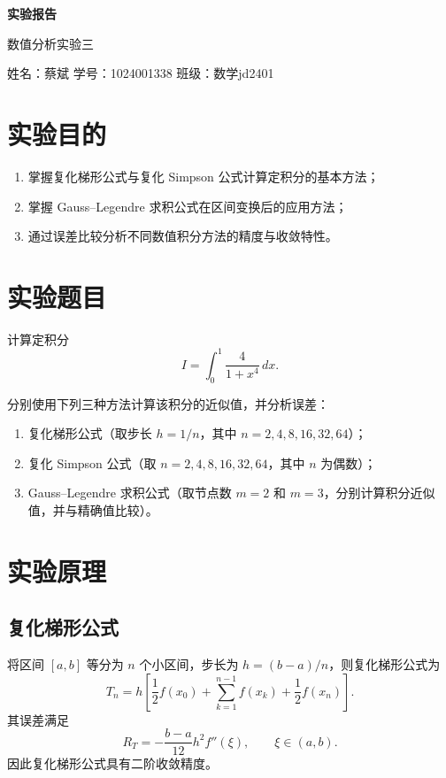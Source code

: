 \documentclass[12pt,a4paper]{ctexart}
\begin{document}
\thispagestyle{empty}

\begin{center}
    {\bfseries 实验报告}

    \vspace{0.7em}
    {数值分析实验三}

    \vspace{1em}
    姓名：蔡斌 \qquad 学号：1024001338 \qquad 班级：\mbox{数学jd2401}
\end{center}

\section{实验目的}

\begin{enumerate}
    \item 掌握复化梯形公式与复化 Simpson 公式计算定积分的基本方法；
    \item 掌握 Gauss--Legendre 求积公式在区间变换后的应用方法；
    \item 通过误差比较分析不同数值积分方法的精度与收敛特性。
\end{enumerate}

\section{实验题目}

计算定积分
\[
I=\int_0^1 \frac{4}{1+x^4}\,dx.
\]

分别使用下列三种方法计算该积分的近似值，并分析误差：
\begin{enumerate}
    \item 复化梯形公式（取步长 $h=1/n$，其中 $n=2,4,8,16,32,64$）；
    \item 复化 Simpson 公式（取 $n=2,4,8,16,32,64$，其中 $n$ 为偶数）；
    \item Gauss--Legendre 求积公式（取节点数 $m=2$ 和 $m=3$，分别计算积分近似值，并与精确值比较）。
\end{enumerate}

\section{实验原理}

\subsection{复化梯形公式}

将区间 $[a,b]$ 等分为 $n$ 个小区间，步长为 $h=(b-a)/n$，则复化梯形公式为
\[
T_n=h\left[\frac{1}{2}f(x_0)+\sum_{k=1}^{n-1}f(x_k)+\frac{1}{2}f(x_n)\right].
\]
其误差满足
\[
R_T=-\frac{b-a}{12}h^2 f''(\xi),\qquad \xi\in(a,b).
\]
因此复化梯形公式具有二阶收敛精度。
\end{document}
